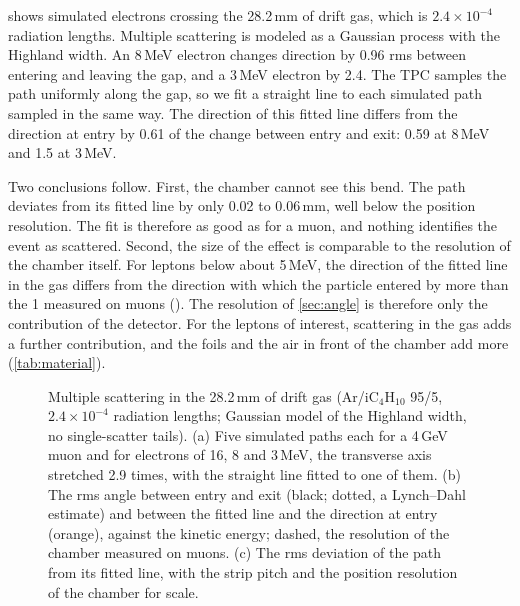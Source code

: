  shows simulated electrons crossing the 28.2\,mm of drift gas, which is $2.4\times10^{-4}$
radiation lengths. Multiple scattering is modeled as a Gaussian process with the Highland width. An 8\,MeV electron
changes direction by 0.96\textdegree{} rms between entering and leaving the gap, and a 3\,MeV electron by
2.4\textdegree. The TPC samples the path uniformly along the gap, so we fit a straight line to each simulated path
sampled in the same way. The direction of this fitted line differs from the direction at entry by 0.61 of the change
between entry and exit: 0.59\textdegree{} at 8\,MeV and 1.5\textdegree{} at 3\,MeV.

Two conclusions follow. First, the chamber cannot see this bend. The path deviates from its fitted line by only 0.02
to 0.06\,mm, well below the position resolution. The fit is therefore as good as for a muon, and nothing identifies
the event as scattered. Second, the size of the effect is comparable to the resolution of the chamber itself. For
leptons below about 5\,MeV, the direction of the fitted line in the gas differs from the direction with which the
particle entered by more than the 1\textdegree{} measured on muons (). The resolution of
\cref{sec:angle} is therefore only the contribution of the detector. For the leptons of interest, scattering in the
gas adds a further contribution, and the foils and the air in front of the chamber add more (\cref{tab:material}).

\begin{figure}[tbp]
  \centering
  \caption{Multiple scattering in the 28.2\,mm of drift gas (Ar/iC$_4$H$_{10}$ 95/5, $2.4\times10^{-4}$ radiation
  lengths; Gaussian model of the Highland width, no single-scatter tails). (a) Five simulated paths each for a 4\,GeV
  muon and for electrons of 16, 8 and 3\,MeV, the transverse axis stretched 2.9 times, with the straight line fitted to
  one of them. (b) The rms angle between entry and exit (black; dotted, a Lynch--Dahl estimate) and between the fitted
  line and the direction at entry (orange), against the kinetic energy; dashed, the resolution of the chamber measured
  on muons. (c) The rms deviation of the path from its fitted line, with the strip pitch and the position resolution
  of the chamber for scale.}
  \label{fig:gasscatter}
\end{figure}

